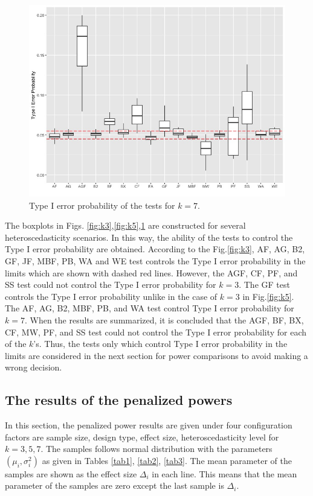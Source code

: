 \begin{figure}
\centering
\includegraphics[scale=0.5]{error_plot_k7.png}
\caption{Type I error probability of the tests for $k=7$.}
\label{fig:k7}
\end{figure}

The boxplots in Figs. \ref{fig:k3},\ref{fig:k5},\ref{fig:k7} are constructed for several heteroscedasticity scenarios. In this way, the ability of the tests to control the Type I error probability are obtained. According to the Fig.\ref{fig:k3}, AF, AG, B2, GF, JF, MBF, PB, WA and WE test controls the Type I error probability in the \cite{bradley:1978} limits which are shown with dashed red lines. However, the AGF, CF, PF, and SS test could not control the Type I error probability for $k=3$. The GF test controls the Type I error probability unlike in the case of $k=3$ in Fig.\ref{fig:k5}. The AF, AG, B2, MBF, PB, and WA test control Type I error probability for $k=7$. When the results are summarized, it is concluded that the AGF, BF, BX, CF, MW, PF, and SS test could not control the Type I error probability for each of the $k$'s. Thus, the tests only which control Type I error probability in the limits are considered in the next section for power comparisons to avoid making a wrong decision.
\subsection{The results of the penalized powers}

In this section, the penalized power results are given under four configuration factors are sample size, design type, effect size, heteroscedasticity level for $k=3, 5, 7$. The samples follows normal distribution with the parameters $(\mu_i, \sigma_i^2)$ as given in Tables \ref{tab1}, \ref{tab2}, \ref{tab3}. The mean parameter of the samples are shown as the effect size $\Delta_i$ in each line. This means that the mean parameter of the samples are zero except the last sample is $\Delta_i$. 

